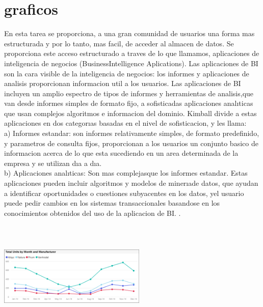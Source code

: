 \documentclass[twoside,twocolumn]{article}
\begin{document}
\section{graficos}
\begin{enumerate}
En esta tarea se proporciona, a una gran comunidad de usuarios una forma mas estructurada y por lo tanto, mas facil, de acceder al almacen de datos. Se proporciona este acceso estructurado a traves de lo que llamamos, aplicaciones de inteligencia de negocios (BusinessIntelligence Aplications). Las aplicaciones de BI son la cara visible de la inteligencia de negocios: los informes y aplicaciones de analisis proporcionan informacion util a los usuarios. Las aplicaciones de BI incluyen un amplio espectro de tipos de informes y herramientas de analisis,que van desde informes simples de formato fijo, a sofisticadas aplicaciones analıticas que usan complejos algoritmos e informacion del dominio. Kimball divide a estas aplicaciones en dos categorıas basadas en el nivel de sofisticacion, y les llama: \\a) Informes estandar: son informes relativamente simples, de formato predefinido, y parametros de consulta fijos, proporcionan a los usuarios un conjunto basico de informacion acerca de lo que esta sucediendo en un area determinada de la empresa y se utilizan dıa a dıa. \\b) Aplicaciones analıticas: Son mas complejasque los informes estandar. Estas aplicaciones pueden incluir algoritmos y modelos de minerıade  datos,  que  ayudan  a  identificar  oportunidades  o  cuestiones  subyacentes  en  los  datos,  yel usuario puede pedir cambios en los sistemas transaccionales basandose en los conocimientos obtenidos del uso de la aplicacion de BI. . \\\\
 
\includegraphics[width=7cm, height=5cm]{Imagenes/power-bi-line}
\\ 

   
\end{enumerate}
\end{document}

